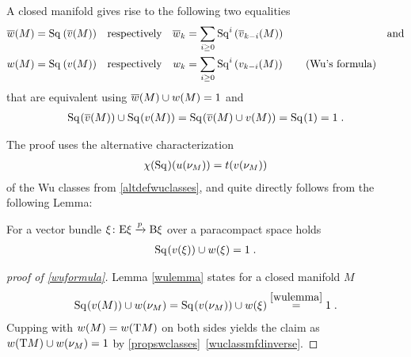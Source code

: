 \begin{Thm}[Wu]\label{wu}
  A closed manifold gives rise to the following two equalities
  \begin{align}\notag
    \overline{w}(M) &= \mathrm{Sq}^{}\left(\overline{v}(M)\right)
    &\text{respectively}&
    &\overline{w}_k &= \sum_{i\geq0} \mathrm{Sq}^{i}\left(\overline{v}_{k-i}(M)\right)
    &\text{and}
    \\
    w(M) &= \mathrm{Sq}^{}\left(v(M)\right)
    &\text{respectively}&
    &w_k &= \sum_{i\geq0} \mathrm{Sq}^{i}\left(v_{k-i}(M)\right)
    \label{wuformula}\tag{Wu's formula}
  \end{align}
  that are equivalent using
  $\overline{w}(M)\cup w(M) = 1$ and
  \begin{gather*}
    \mathrm{Sq}^{}(\overline{v}(M))\cup\mathrm{Sq}^{}(v(M))
    = \mathrm{Sq}^{}(\overline{v}(M)\cup v(M))
    = \mathrm{Sq}^{}(1)
    = 1
    \;.
  \end{gather*}
\end{Thm}
The proof uses the alternative characterization
\begin{gather*}
  \chi(\mathrm{Sq}^{})(u(\nu_{M})) = t(v(\nu_{M}))
\end{gather*}
of the Wu classes from \autoref{altdefwuclasses}, and quite directly
follows from the following Lemma:
\begin{Lem}\label{wulemma}
  For a vector bundle $\xi\colon \mathrm{E}\xi\xrightarrow{p}\mathrm{B}\xi$ over a
  paracompact space holds
  \begin{gather*}
    \mathrm{Sq}^{}(v(\xi)) \cup w(\xi)= 1
    \;.
  \end{gather*}
\end{Lem}
\begin{proof}[proof of \ref{wuformula}]
  Lemma \autoref{wulemma} states for a closed manifold $M$
  \begin{gather*}
    \Sq{}(\v(M)) \cup \w(\N M)
    = \Sq{}(\v(\N M)) \cup \w(\xi)
    \overset{\autoref{wulemma}}= 1
    \;.
  \end{gather*}
  Cupping with $w(M)=w(\mathrm{T}M)$ on both sides yields the claim
  as $w(\mathrm{T}M) \cup w(\nu_{M}) = 1$ by
  \autoref{propswclasses}~\ref{wuclassmfdinverse}.
\end{proof}

